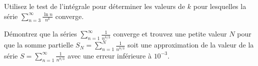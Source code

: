 \begin{question}[\eng]
Utilisez le test de l'intégrale pour déterminer les valeurs de $k$
pour lesquelles la série
$\displaystyle \sum_{n=3}^{\infty} \frac{\ln n}{n^k}$ converge.
\label{8Q37}
\end{question}

\begin{question}
Démontrez que la séries $\displaystyle \sum_{n=1}^\infty \frac{1}{n^{8/3}}$
converge et trouvez une petite valeur $N$ pour que la somme partielle
$\displaystyle S_N = \sum_{n=1}^N \frac{1}{n^{8/3}}$ soit une
approximation de la valeur de la série
$\displaystyle S = \sum_{n=1}^\infty \frac{1}{n^{8/3}}$
avec une erreur inférieure à $10^{-3}$.
\label{8Q38}
\end{question}

